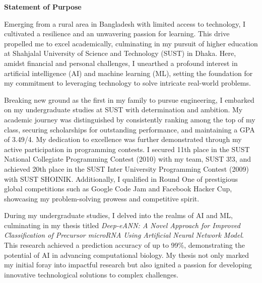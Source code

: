 \documentclass[11pt]{article}
\newif\ifshowsections
\begin{document}
\begin{center}
    {\Large \textbf{Statement of Purpose}}
\end{center}

\ifshowsections\section*{Introduction}\fi

Emerging from a rural area in Bangladesh with limited access to technology, I cultivated a resilience
and an unwavering passion for learning. This drive propelled me to excel academically, culminating
in my pursuit of higher education at Shahjalal University of Science and Technology (SUST) in Dhaka.
Here, amidst financial and personal challenges, I unearthed a profound interest in artificial intelligence
(AI) and machine learning (ML), setting the foundation for my commitment to leveraging technology to solve
intricate real-world problems.

\ifshowsections\section*{Academic Journey}\fi

Breaking new ground as the first in my family to pursue engineering, I embarked on my undergraduate studies
at SUST with determination and ambition. My academic journey was distinguished by consistently ranking
among the top of my class, securing scholarships for outstanding performance, and maintaining a GPA of
3.49/4. My dedication to excellence was further demonstrated through my active participation in
programming contests. I secured 11th place in the SUST National Collegiate Programming Contest
(2010) with my team, SUST 3!3, and achieved 20th place in the SUST Inter University Programming Contest
(2009) with SUST SHOINIK. Additionally, I qualified in Round One of prestigious global competitions
such as Google Code Jam and Facebook Hacker Cup, showcasing my problem-solving prowess and competitive
spirit.

During my undergraduate studies, I delved into the realms of AI and ML, culminating in my thesis titled
\textit{Deep-eANN: A Novel Approach for Improved Classification of Precursor microRNA Using
Artificial Neural Network Model}. This research achieved a prediction accuracy of up to 99\%, demonstrating
the potential of AI in advancing computational biology. My thesis not only marked my initial foray into
impactful research but also ignited a passion for developing innovative technological solutions to complex
challenges.
\end{document}
